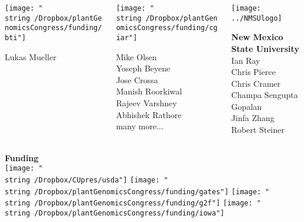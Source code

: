 \documentclass[11pt, aspectratio=169]{beamer}
\begin{document}
{\begin{columns}
\begin{column}{0.2\linewidth}
\vspace{0.5cm}

\texttt{[image: "\\string~/Dropbox/plantGenomicsCongress/funding/bti"]}

\scriptsize 
Lukas Mueller \\

\end{column}


\begin{column}{0.2\linewidth}


\texttt{[image: "\\string~/Dropbox/plantGenomicsCongress/funding/cgiar"]}

\scriptsize 
Mike Olsen \\
Yoseph Beyene \\
Jose Crossa \\
Manish Roorkiwal \\
Rajeev Varshney \\
Abhishek Rathore \\
many more...
\end{column}

\begin{column}{0.2\linewidth}


\texttt{[image: ../NMSUlogo]}

\normalsize {\textbf{New Mexico State University}}
\scriptsize 
Ian Ray\\
Chris Pierce\\
Chris Cramer\\
Champa Sengupta Gopalan\\
Jinfa Zhang\\
Robert Steiner\\
\end{column}

\end{columns}

\textbf{Funding}\\
\texttt{[image: "\\string~/Dropbox/CUpres/usda"]} \hspace{0.5cm}
\texttt{[image: "\\string~/Dropbox/plantGenomicsCongress/funding/gates"]} \hspace{0.5cm}
\texttt{[image: "\\string~/Dropbox/plantGenomicsCongress/funding/g2f"]} \hspace{0.5cm}
\texttt{[image: "\\string~/Dropbox/plantGenomicsCongress/funding/iowa"]}


}
\end{document}
